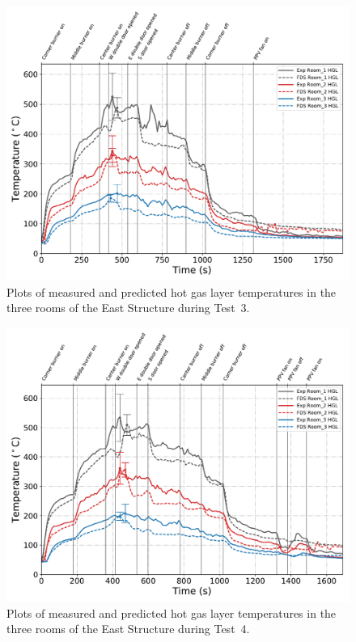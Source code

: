 \begin{figure}[!h]
	\centering
	\includegraphics[width=\columnwidth]{Figures/Plots/Validation/Temperature/Test_3_HGL}
	\caption[Plots of measured and predicted hot gas layer temperatures during Test~3.]{Plots of measured and predicted hot gas layer temperatures in the three rooms of the East Structure during Test~3.}
	\label{fig:HGL_data_Test3}
\end{figure}

\begin{figure}[!h]
	\centering
	\includegraphics[width=\columnwidth]{Figures/Plots/Validation/Temperature/Test_4_HGL}
	\caption[Plots of measured and predicted hot gas layer temperatures during Test~4.]{Plots of measured and predicted hot gas layer temperatures in the three rooms of the East Structure during Test~4.}
	\label{fig:HGL_data_Test4}
\end{figure}

